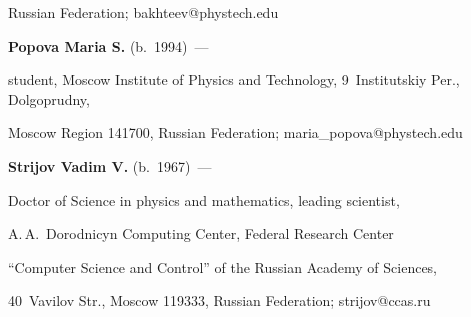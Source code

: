 Russian Federation; bakhteev@phystech.edu 





\vspace*{3pt}   





 \noindent


\textbf{Popova Maria S.} (b.\ 1994)~---


student, Moscow Institute of Physics and Technology, 9~Institutskiy Per., Dolgoprudny, 


Moscow Region 141700,   Russian Federation; maria\_popova@phystech.edu  





\vspace*{3pt}  





 


\noindent


\textbf{Strijov Vadim V.} (b.\ 1967)~--- 


Doctor of Science in physics and mathematics, leading scientist, 


A.\,A.~Dorodnicyn Computing Center, Federal Research Center 


``Computer Science and Control'' of the Russian Academy of Sciences, 


40~Vavilov Str., Moscow 119333, Russian Federation; strijov@ccas.ru 








\label{end\stat}








\renewcommand{\bibname}{\protect\rm Литература}


